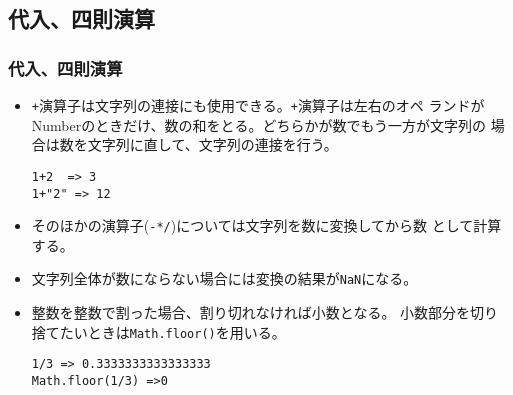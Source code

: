 \subsection{代入、四則演算}
\begin{frame}[containsverbatim]
 \frametitle{代入、四則演算}
\begin{itemize}
 \item \Verb-+-演算子は文字列の連接にも使用できる。\Verb-+-演算子は左右のオペ
ランドがNumberのときだけ、数の和をとる。どちらかが数でもう一方が文字列の
場合は数を文字列に直して、文字列の連接を行う。
\begin{Verbatim}
1+2  => 3
1+"2" => 12
\end{Verbatim}
 \item そのほかの演算子(\Verb+-*/+)については文字列を数に変換してから数
       として計算する。
 \item 文字列全体が数にならない場合には変換の結果が\Verb+NaN+になる。

 \item 整数を整数で割った場合、割り切れなければ小数となる。
       小数部分を切り捨てたいときは\Verb+Math.floor()+を用いる。
\begin{Verbatim}
1/3 => 0.3333333333333333
Math.floor(1/3) =>0
\end{Verbatim}
\end{itemize}
\end{frame}
